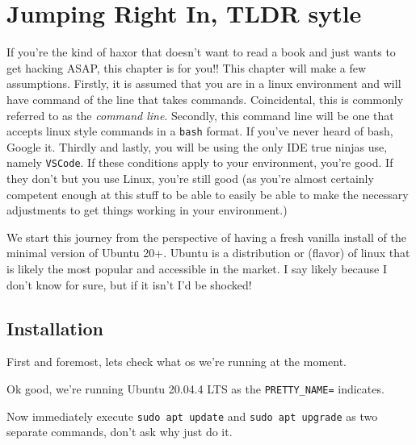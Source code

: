 \chapter{Jumping Right In, TLDR sytle}
If you're the kind of haxor that doesn't want to read a book and just wants to get hacking ASAP, this chapter is for you!! This chapter will make a few assumptions. Firstly, it is assumed that you are in a linux environment and will have command of the line that takes commands. Coincidental, this is commonly referred to as the \emph{command line}. Secondly, this command line will be one that accepts linux style commands in a \texttt{bash} format. If you've never heard of bash, Google it. Thirdly and lastly, you will be using the only IDE true ninjas use, namely \texttt{VSCode}. If these conditions apply to your environment, you're good. If they don't but you use Linux, you're still good (as you're almost certainly competent enough at this stuff to be able to easily be able to make the necessary adjustments to get things working in your environment.)

We start this journey from the perspective of having a fresh vanilla install of the minimal version of Ubuntu 20+. Ubuntu is a distribution or (flavor) of linux that is likely the most popular and accessible in the market. I say likely because I don't know for sure, but if it isn't I'd be shocked!

\section{Installation}
First and foremost, lets check what os we're running at the moment.
\par
{}
Ok good, we're running Ubuntu 20.04.4 LTS as the \texttt{PRETTY\_NAME=} indicates.

Now immediately execute \texttt{sudo apt update} and \texttt{sudo apt upgrade} as two separate commands, don't ask why just do it.

